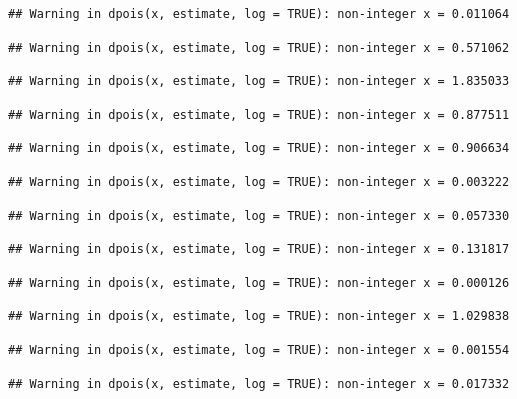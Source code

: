 \documentclass[]{article}
\begin{document}
\begin{verbatim}
## Warning in dpois(x, estimate, log = TRUE): non-integer x = 0.011064
\end{verbatim}

\begin{verbatim}
## Warning in dpois(x, estimate, log = TRUE): non-integer x = 0.571062
\end{verbatim}

\begin{verbatim}
## Warning in dpois(x, estimate, log = TRUE): non-integer x = 1.835033
\end{verbatim}

\begin{verbatim}
## Warning in dpois(x, estimate, log = TRUE): non-integer x = 0.877511
\end{verbatim}

\begin{verbatim}
## Warning in dpois(x, estimate, log = TRUE): non-integer x = 0.906634
\end{verbatim}

\begin{verbatim}
## Warning in dpois(x, estimate, log = TRUE): non-integer x = 0.003222
\end{verbatim}

\begin{verbatim}
## Warning in dpois(x, estimate, log = TRUE): non-integer x = 0.057330
\end{verbatim}

\begin{verbatim}
## Warning in dpois(x, estimate, log = TRUE): non-integer x = 0.131817
\end{verbatim}

\begin{verbatim}
## Warning in dpois(x, estimate, log = TRUE): non-integer x = 0.000126
\end{verbatim}

\begin{verbatim}
## Warning in dpois(x, estimate, log = TRUE): non-integer x = 1.029838
\end{verbatim}

\begin{verbatim}
## Warning in dpois(x, estimate, log = TRUE): non-integer x = 0.001554
\end{verbatim}

\begin{verbatim}
## Warning in dpois(x, estimate, log = TRUE): non-integer x = 0.017332
\end{verbatim}
\end{document}

